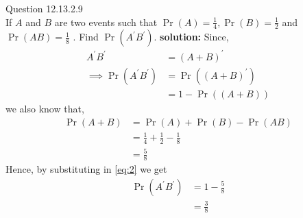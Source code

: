\documentclass{article}
\begin{document}
\providecommand{\pr}[1]{\ensuremath{\Pr\left(#1\right)}}
\providecommand{\brak}[1]{\ensuremath{\left(#1\right)}}
\newcommand{\solution}{\noindent \textbf{solution: }}

Question 12.13.2.9\\
If $A$ and $B$ are two events such that $\pr{A} = \frac{1}{4}, \pr{B} = \frac{1}{2}$ and $\pr{AB} = \frac{1}{8}$ . Find $\pr{A^{\prime}B^{\prime}}.$
\fi
\solution
Since,
\begin{align}
	A^{\prime}B^{\prime} &= \brak{A+B}^{\prime} \\ \label{eq:2}
	\implies \pr{A^{\prime}B^{\prime}} &= \pr{\brak{A+B}^{\prime}} \\
	&= 1-\pr{\brak{A+B}}
\end{align}
we also know that,
\begin{align}
	\pr{A+B} &= \pr{A} + \pr{B} - \pr{AB} \\
	&= \frac{1}{4} +\frac{1}{2} - \frac{1}{8} \\
	&= \frac{5}{8}
\end{align}
Hence, by substituting in \eqref{eq:2} we get
\begin{align}
	\pr{A^{\prime}B^{\prime}} &= 1 - \frac{5}{8} \\
	&= \frac{3}{8}
\end{align}
\end{document}
